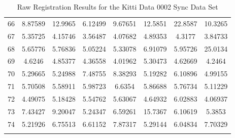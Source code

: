 \begin{center}
\begin{longtable}{cccccccc}
66 & 8.87589 & 12.9965 & 6.12499 & 9.67651 & 12.5851 & 22.8587 & 10.3265\\
67 & 5.35725 & 4.15746 & 3.56487 & 4.07682 & 4.89353 & 4.3177 & 3.84733\\
68 & 5.65776 & 5.76836 & 5.05224 & 5.33078 & 6.91079 & 5.95726 & 25.0134\\
69 & 4.6246 & 4.85377 & 4.36558 & 4.01962 & 5.30473 & 4.62669 & 4.2464\\
70 & 5.29665 & 5.24988 & 7.48755 & 8.38293 & 5.19282 & 6.10896 & 4.99155\\
71 & 5.70508 & 5.58911 & 5.98723 & 6.6354 & 5.86688 & 5.76734 & 5.11229\\
72 & 4.49075 & 5.18428 & 5.54762 & 5.63067 & 4.64932 & 6.02883 & 4.06937\\
73 & 7.43427 & 9.20047 & 5.24347 & 6.59261 & 15.7367 & 6.10619 & 5.3853\\
74 & 5.21926 & 6.75513 & 6.61152 & 7.87317 & 5.29144 & 6.04834 & 7.70329\\
\caption{Raw Registration Results for the Kitti Data 0002 Sync Data Set}
\label{tab:kittidata0002syncFULL}
\end{longtable}
\end{center} 



